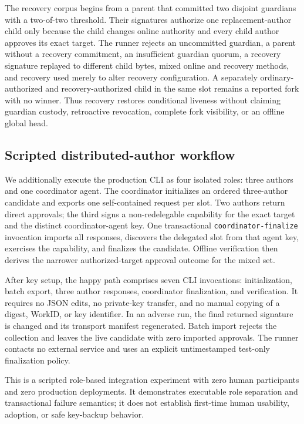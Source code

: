 \documentclass[acmsmall,screen,review,nonacm]{acmart}
\begin{document}
The recovery corpus begins from a parent that committed two disjoint guardians
with a two-of-two threshold. Their signatures authorize one replacement-author
child only because the child changes online authority and every child author
approves its exact target. The runner rejects an uncommitted guardian, a parent
without a recovery commitment, an insufficient guardian quorum, a recovery
signature replayed to different child bytes, mixed online and recovery methods,
and recovery used merely to alter recovery configuration. A separately ordinary-
authorized and recovery-authorized child in the same slot remains a reported
fork with no winner. Thus recovery restores conditional liveness without
claiming guardian custody, retroactive revocation, complete fork visibility, or
an offline global head.

\subsection{Scripted distributed-author workflow}

We additionally execute the production CLI as four isolated roles: three
authors and one coordinator agent. The coordinator initializes an ordered
three-author candidate and exports one self-contained request per slot. Two
authors return direct approvals; the third signs a non-redelegable capability
for the exact target and the distinct coordinator-agent key. One transactional
\texttt{coordinator-finalize} invocation imports all responses, discovers the
delegated slot from that agent key, exercises the capability, and finalizes the
candidate. Offline verification then derives the narrower authorized-target
approval outcome for the mixed set.

After key setup, the happy path comprises seven CLI invocations: initialization,
batch export, three author responses, coordinator finalization, and
verification. It requires no JSON edits, no private-key transfer, and no manual
copying of a digest, WorkID, or key identifier. In an adverse run, the final
returned signature is changed and its transport manifest regenerated. Batch
import rejects the collection and leaves the live candidate with zero imported
approvals. The runner contacts no external service and uses an explicit
untimestamped test-only finalization policy.

This is a scripted role-based integration experiment with zero human
participants and zero production deployments. It demonstrates executable role
separation and transactional failure semantics; it does not establish first-time
human usability, adoption, or safe key-backup behavior.
\end{document}
